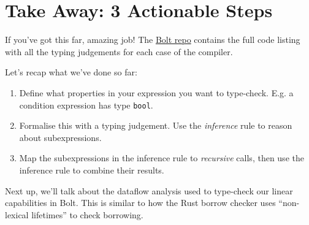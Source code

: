 {{\hypertarget{take-away-3-actionable-steps}{%
\section{\texorpdfstring{\protect\hyperlink{take-away-3-actionable-steps}{}Take
Away: 3 Actionable
Steps}{Take Away: 3 Actionable Steps}}\label{take-away-3-actionable-steps}}

If you've got this far, amazing job! The
\href{https://github.com/mukul-rathi/bolt}{Bolt repo} contains the full
code listing with all the typing judgements for each case of the
compiler.

Let's recap what we've done so far:

\begin{enumerate}
\tightlist
\item
  Define what properties in your expression you want to type-check. E.g.
  a condition expression has type \texttt{bool}.
\item
  Formalise this with a typing judgement. Use the \emph{inference} rule
  to reason about subexpressions.
\item
  Map the subexpressions in the inference rule to \emph{recursive}
  calls, then use the inference rule to combine their results.
\end{enumerate}

Next up, we'll talk about the dataflow analysis used to type-check our
linear capabilities in Bolt. This is similar to how the Rust borrow
checker uses ``non-lexical lifetimes'' to check borrowing.

}}
